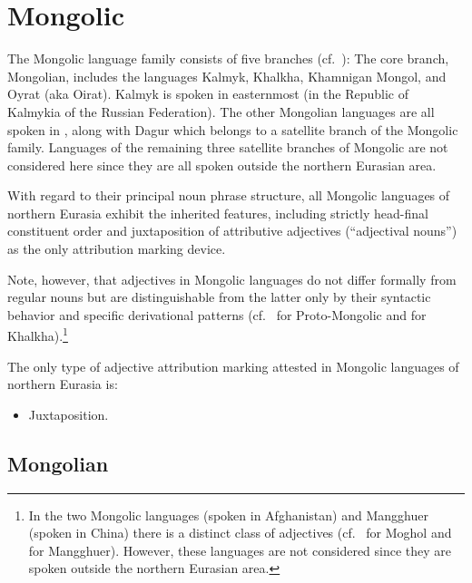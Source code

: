 \section{Mongolic}
The Mongolic language family consists of five branches (cf.~\citealt[222]{salminen2007}): The core branch, Mongolian, includes the languages Kalmyk, Khalkha, Khamnigan Mongol, and Oyrat (aka Oirat). Kalmyk is spoken in easternmost  (in the Republic of Kalmykia of the Russian Federation). The other Mongolian languages are all spoken in , along with Dagur which belongs to a satellite branch of the Mongolic family. Languages of the remaining three satellite branches of Mongolic are not considered here since they are all spoken outside the northern Eurasian area.

With regard to their principal noun phrase structure, all Mongolic languages of northern Eurasia exhibit the inherited  features, including strictly head-final constituent order and juxtaposition of attributive adjectives (“adjectival nouns”) as the only attribution marking device.

Note, however, that adjectives in Mongolic languages do not differ formally from regular nouns but are distinguishable from the latter only by their syntactic behavior and specific derivational patterns (cf.~\citealt[10]{janhunen2003b} for Proto\hyp{}Mongolic and \citealt[161]{svantesson2003} for Khalkha).\footnote{In the two Mongolic languages  (spoken in Afghanistan) and Mangghuer (spoken in China) there is a distinct class of adjectives (cf.~\citealt[252]{weiers2003} for Moghol and \citealt[311]{slater2003} for Mangghuer). However, these languages are not considered since they are spoken outside the northern Eurasian area.}

The only type of adjective attribution marking attested in Mongolic languages of northern Eurasia is:
\begin{itemize}
\item Juxtaposition.
\end{itemize}

\subsection{Mongolian}
